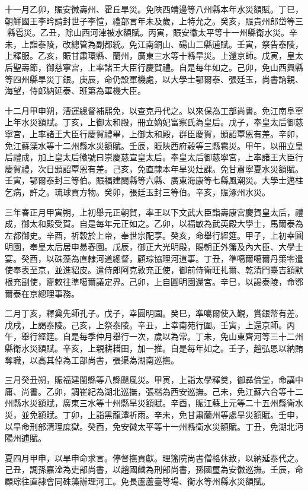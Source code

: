 \begin{pinyinscope}
十一月乙卯，賑安徽壽州、霍丘旱災。免陜西靖邊等八州縣本年水災額賦。丁巳，朝鮮國王李昑請封世子李愃，禮部言年未及歲，上特允之。癸亥，賑貴州郎岱等三縣雹災。乙丑，除山西河津被水額賦。丙寅，賑安徽太平等十一州縣衛水災。辛未，上詣泰陵，改總管為副都統。免江南銅山、碭山二縣逋賦。壬寅，祭告泰陵，上釋服。乙亥，賑甘肅環縣、蘭州，廣東三水等十縣旱災。上還京師。戊寅，皇太后聖壽節，御慈寧宮，上率諸王大臣行慶賀禮。自是每年如之。己卯，免山西興縣等四州縣旱災丁銀。庚辰，命仍設軍機處，以大學士鄂爾泰、張廷玉，尚書訥親、海望，侍郎納延泰、班第為軍機大臣。

十二月甲申朔，漕運總督補熙免，以查克丹代之。以來保為工部尚書。免江南阜寧上年水災額賦。丁亥，上御太和殿，冊立嫡妃富察氏為皇后。戊子，奉皇太后御慈寧宮，上率諸王大臣行慶賀禮畢，上御太和殿，群臣慶賀，頒詔覃恩有差。辛卯，免江蘇溧水等十二州縣水災額賦。壬辰，賑陜西府穀等三縣雹災。甲午，以冊立皇后禮成，加上皇太后徽號曰崇慶慈宣皇太后。奉皇太后御慈寧宮，上率諸王大臣行慶賀禮，次日頒詔覃恩有差。己亥，免直隸本年旱災灶課。免甘肅寧夏水災額賦。壬寅，鄂爾泰封三等伯。賑福建閩縣等六縣、廣東海康等七縣風潮災。大學士邁柱乞病，許之。琉球貢方物。癸卯，張廷玉封三等伯。辛亥，賑涿州水災。

三年春正月甲寅朔，上初舉元正朝賀，率王以下文武大臣詣壽康宮慶賀皇太后，禮成，御太和殿受賀。自是每年元正如之。乙卯，以福敏為武英殿大學士，馬爾泰為左都御史。辛酉，祈穀於上帝，奉世宗配享。癸亥，命舉行經筵。甲子，上初幸圓明園，奉皇太后居申昜春園。戊辰，御正大光明殿，賜朝正外籓及內大臣、大學士宴。癸酉，以硃藻為直隸河道總督，顧琮協理河道事。丁丑，準噶爾噶爾丹策零遣使奉表至京，並進貂皮。遣侍郎阿克敦充正使，御前侍衛旺扎爾、乾清門臺吉額默根充副使，齎敕往準噶爾議定界。己卯，上自圓明園還宮。辛巳，以謁泰陵，命鄂爾泰在京總理事務。

二月丁亥，釋奠先師孔子。戊子，幸圓明園。癸巳，準噶爾使入覲，賞銀幣有差。戊戌，上謁泰陵。己亥，上祭泰陵。辛丑，上幸南苑行圍。壬寅，上還京師。丙午，舉行經筵。自是每季仲月舉行一次，歲以為常。丁未，免山東齊河等三十二州縣衛水災額賦。辛亥，上親耕耤田，加一推。自是每年如之。壬子，趙弘恩以納賄奪職，以高其倬為工部尚書，張渠為湖南巡撫。

三月癸丑朔，賑福建閩縣等八縣颶風災。甲寅，上詣太學釋奠，御彞倫堂，命講中庸、尚書。乙卯，調崔紀為湖北巡撫，張楷為西安巡撫。己未，免江蘇六合等十二州縣水災額賦，廣東三水等十州縣旱災額賦。辛酉，賑江蘇上元等二十五州縣衛水災，並免額賦。丁卯，上詣黑龍潭祈雨。辛未，免甘肅蘭州等處旱災額賦。壬申，以旱命刑部清理庶獄。癸酉，免安徽太平等十一州縣衛水災額賦。丁丑，免湖北沔陽州逋賦。

夏四月甲申，以旱申命求言。停督撫貢獻。理籓院尚書僧格休致，以納延泰代之。己丑，調孫嘉淦為吏部尚書，以趙國麟為刑部尚書，孫國璽為安徽巡撫。壬辰，命顧琮往直隸會同硃藻辦理河工。免長蘆蘆臺等場、衡水等州縣水災額賦。


\end{pinyinscope}
